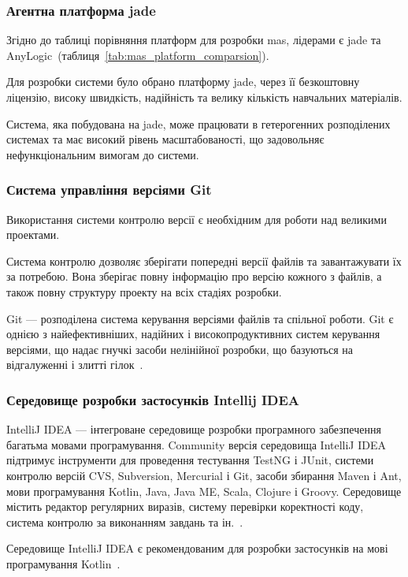 \subsubsection{Агентна платформа \acrshort{jade}}
Згідно до таблиці порівняння платформ для розробки \acrshort{mas}, лідерами є \acrshort{jade} та AnyLogic~(таблиця~\ref{tab:mas_platform_comparsion}). 

Для розробки системи було обрано платформу \acrshort{jade}, через її безкоштовну ліцензію, високу швидкість, надійність та велику кількість навчальних матеріалів.

Система, яка побудована на \acrshort{jade}, може працювати в гетерогенних розподілених системах та має високий рівень масштабованості, що задовольняє нефункціональним вимогам до системи.

\subsubsection{Система управління версіями Git}
Використання системи контролю версії є необхідним для роботи над великими проектами.

Система контролю дозволяє зберігати попередні версії файлів та завантажувати їх за потребою. 
Вона зберігає повну інформацію про версію кожного з файлів, а також повну структуру проекту на всіх стадіях розробки.

Git --- розподілена система керування версіями файлів та спільної роботи. Git є однією з найефективніших, надійних і високопродуктивних систем керування версіями, що надає гнучкі засоби нелінійної розробки, що базуються на відгалуженні і злитті гілок~\cite{Chacon2009}.

\subsubsection{Середовище розробки застосунків Intellij IDEA}
IntelliJ IDEA --- інтегроване середовище розробки програмного забезпечення багатьма мовами програмування. 
Community версія середовища IntelliJ IDEA підтримує інструменти для проведення тестування TestNG і JUnit, системи контролю версій CVS, Subversion, Mercurial і Git, засоби збирання Maven і Ant, мови програмування Kotlin, Java, Java ME, Scala, Clojure і Groovy. 
Середовище містить редактор регулярних виразів, систему перевірки коректності коду, система контролю за виконанням завдань та ін.~\cite{Kalinichenko2013}.

Середовище IntelliJ IDEA є рекомендованим для розробки застосунків на мові програмування Kotlin~\cite{kotlin}.
